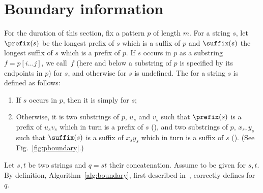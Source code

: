  
\section{Boundary information}
For the duration of this section, fix a pattern $p$ of length $m$. 
For a string $s$, let $\prefix(s)$ be the longest prefix of $s$ which is a suffix of $p$ and $\suffix(s)$ the longest suffix of $s$ which is a prefix of $p$. If $s$ occurs in $p$ as a substring $f = p[i\dots j]$, we call~$f$ (here and below a substring of $p$ is specified by its endpoints in $p$) \emph{} for $s$, and otherwise  for $s$ is undefined. 
The \emph{} for a string $s$ is defined as follows:
\begin{enumerate}
\item If $s$ occurs in $p$, then it is simply  for $s$;
\item Otherwise, it is two substrings of $p$, $u_s$ and $v_s$ such that $\prefix(s)$ is a prefix of $u_s v_s$ which in turn is a prefix of $s$ (\emph{}), and two substrings of $p$, $x_s, y_s$ such that $\suffix(s)$ is a suffix of $x_s y_s$ which in turn is a suffix of $s$ (\emph{}). (See Fig.~\ref{fig:pboundary}.)
\end{enumerate}


Let $s, t$ be two strings and $q = st$ their concatenation. Assume to be given  for $s, t$. By definition, Algorithm~\ref{alg:boundary}, first described in~\cite{DBLP:conf/soda/GanardiG22}, correctly defines  for $q$.

